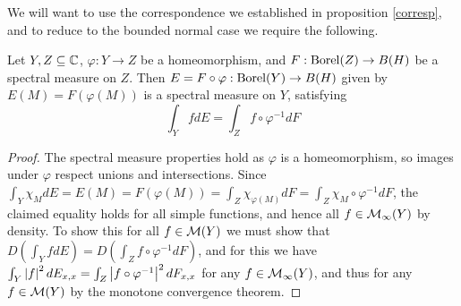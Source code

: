 \documentclass[10pt]{amsart}
\begin{document}
We will want to use the correspondence we established in proposition \ref{corresp}, and to reduce to the bounded normal case we require the following.
\begin{lemma}
    Let $Y, Z \subseteq \mathbb{C}$, $\varphi : Y \to Z$ be a homeomorphism, and $F : \operatorname{Borel}(Z) \to B(H)$ be a spectral measure on $Z$. Then $E = F \circ \varphi : \operatorname{Borel}(Y) \to B(H)$ given by $E(M) = F(\varphi(M))$ is a spectral measure on $Y$, satisfying
    $$
        \int_Y fdE = \int_Z f \circ \varphi^{-1}dF
    $$
\end{lemma}
\begin{proof}
    The spectral measure properties hold as $\varphi$ is a homeomorphism, so images under $\varphi$ respect unions and intersections. Since $\int_Y \chi_M dE = E(M) = F(\varphi(M)) = \int_Z \chi_{\varphi(M)} dF = \int_Z \chi_M \circ \varphi^{-1} dF$, the claimed equality holds for all simple functions, and hence all $f \in \mathcal{M}_\infty(Y)$ by density. To show this for all $f \in \mathcal{M}(Y)$ we must show that $D(\int_Y f dE) = D(\int_Z f \circ \varphi^{-1} dF)$, and for this we have $\int_Y \left| f \right|^2 dE_{x, x} = \int_Z \left| f \circ \varphi^{-1} \right|^2 dF_{x, x}$ for any $f \in \mathcal{M}_\infty(Y)$, and thus for any $f \in \mathcal{M}(Y)$ by the monotone convergence theorem.
\end{proof}


\end{document}
